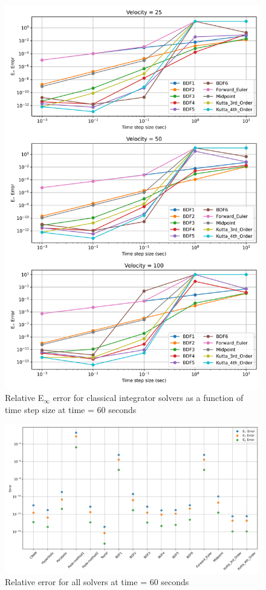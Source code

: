\begin{figure}[p]
    \centering
    \includegraphics[width=5in]{images/chapter-5/caseStudies/neutronPrecursors/dt60/neutronPrecursorsEinfErrorerrorIntegrators.png}
    \caption{Relative E$_{\infty}$ error for classical integrator solvers as a function of time step size at time = 60 seconds}
    \label{fig:neutron_precursors_Einf_classical_integrator}
\end{figure}

\clearpage

\begin{figure}[p]
    \centering
    \includegraphics[width=5in]{images/chapter-5/caseStudies/neutronPrecursors/dt60/neutronPrecursorsAllSolverErrors.png}
    \caption{Relative error for all solvers at time = 60 seconds}
    \label{fig:neutron_precursors_error_all_solvers}
\end{figure}

